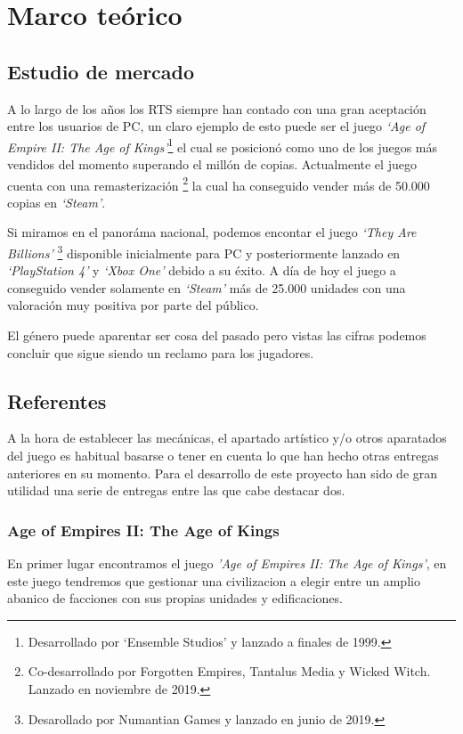 \chapter{Marco teórico}
\label{Marco_teorico}

\section{Estudio de mercado}
A lo largo de los años los \ac{RTS} siempre han contado con una gran aceptación entre
los usuarios de \ac{PC}, un claro ejemplo de esto puede ser el juego \textit{`Age of
Empire II: The Age of Kings'}\footnote{Desarrollado por `Ensemble Studios' y lanzado a
finales de 1999.} el cual se posicionó como uno de los juegos más vendidos del momento
superando el millón de copias. Actualmente el juego cuenta con una remasterización
\footnote{Co-desarrollado por Forgotten Empires, Tantalus Media y Wicked
Witch. Lanzado en noviembre de 2019.} la cual ha conseguido vender más de 50.000
copias en \textit{`Steam'}.

Si miramos en el panoráma nacional, podemos encontar el juego \textit{`They Are
Billions'} \footnote{Desarollado por Numantian Games y lanzado en junio de 2019.}
disponible inicialmente para \ac{PC} y posteriormente lanzado en \textit{`PlayStation 4'}
y \textit{`Xbox One'} debido a su éxito. A día de hoy el juego a conseguido vender
solamente en \textit{`Steam'} más de 25.000 unidades con una valoración muy positiva por
parte del público.

El género puede aparentar ser cosa del pasado pero vistas las cifras podemos concluir
que sigue siendo un reclamo para los jugadores.

\section{Referentes}
A la hora de establecer las mecánicas, el apartado artístico y/o otros aparatados del
juego es habitual basarse o tener en cuenta lo que han hecho otras entregas anteriores
en su momento. Para el desarrollo de este proyecto han sido de gran utilidad una
serie de entregas entre las que cabe destacar dos.

\subsection{Age of Empires II: The Age of Kings}
En primer lugar encontramos el juego \textit{'Age of Empires II: The Age of Kings'}, en
este juego tendremos que gestionar una civilizacion a elegir entre un amplio abanico de
facciones con sus propias unidades y edificaciones.

